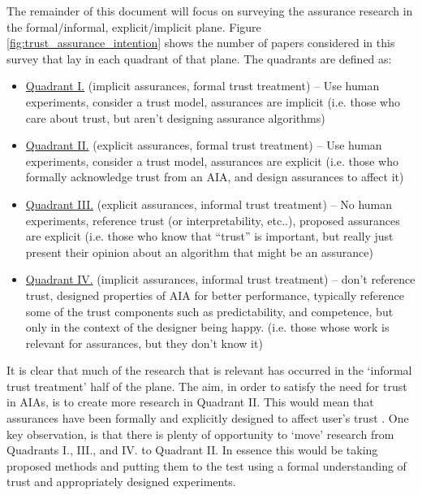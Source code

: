 The remainder of this document will focus on surveying the assurance research in the formal/informal, explicit/implicit plane. Figure \ref{fig:trust_assurance_intention} shows the number of papers considered in this survey that lay in each quadrant of that plane. The quadrants are defined as:

\begin{itemize}
    \item \hyperref[sec:q1]{Quadrant I.} (implicit assurances, formal trust treatment) -- Use human experiments, consider a trust model, assurances are implicit (i.e. those who care about trust, but aren't designing assurance algorithms)
    \item \hyperref[sec:q2]{Quadrant II.} (explicit assurances, formal trust treatment) -- Use human experiments, consider a trust model, assurances are explicit (i.e. those who formally acknowledge trust from an AIA, and design assurances to affect it)
    \item \hyperref[sec:q3]{Quadrant III.} (explicit assurances, informal trust treatment) -- No human experiments, reference trust (or interpretability, etc..), proposed assurances are explicit (i.e. those who know that ``trust'' is important, but really just present their opinion about an algorithm that might be an assurance)
    \item \hyperref[sec:q4]{Quadrant IV.} (implicit assurances, informal trust treatment) -- don't reference trust, designed properties of AIA for better performance, typically reference some of the trust components such as predictability, and competence, but only in the context of the designer being happy. (i.e. those whose work is relevant for assurances, but they don't know it)
\end{itemize}

It is clear that much of the research that is relevant has occurred in the `informal trust treatment' half of the plane. The aim, in order to satisfy the need for trust in AIAs, is to create more research in Quadrant II.  This would mean that assurances have been formally and explicitly designed to affect user's trust . 
One key observation, is that there is plenty of opportunity to `move' research from Quadrants I., III., and IV. to Quadrant II. In essence this would be taking proposed methods and putting them to the test using a formal understanding of trust and appropriately designed experiments.





